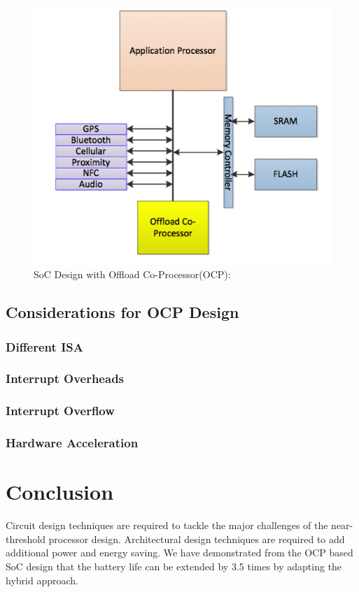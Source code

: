 \documentclass[conference]{IEEEtran}
\begin{document}
\begin{figure}[htbp]
	\includegraphics[width=\linewidth]{img/Pictures/AP.png}
	\centering
    \caption{SoC Design with Offload Co-Processor(OCP): \cite{b2}}
    \label{fig:AP}
\end{figure}

\subsection{Considerations for OCP Design}
\subsubsection{Different ISA}
\subsubsection{Interrupt Overheads}
\subsubsection{Interrupt Overflow}
\subsubsection{Hardware Acceleration}

\section{Conclusion}
Circuit design techniques are required to tackle the major challenges of the
near-threshold processor design. Architectural design techniques are required
to add additional power and energy saving. We have demonstrated from the OCP
based SoC design that the battery life can be extended by 3.5 times by adapting
the hybrid approach.
\end{document}
